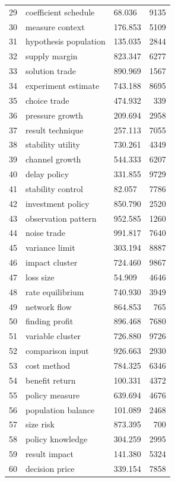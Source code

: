\documentclass[11pt]{report}
\begin{document}
\begin{longtable}{rllr}
29 & coefficient schedule & 68.036 & 9135 \\
30 & measure context & 176.853 & 5109 \\
31 & hypothesis population & 135.035 & 2844 \\
32 & supply margin & 823.347 & 6277 \\
33 & solution trade & 890.969 & 1567 \\
34 & experiment estimate & 743.188 & 8695 \\
35 & choice trade & 474.932 & 339 \\
36 & pressure growth & 209.694 & 2958 \\
37 & result technique & 257.113 & 7055 \\
38 & stability utility & 730.261 & 4349 \\
39 & channel growth & 544.333 & 6207 \\
40 & delay policy & 331.855 & 9729 \\
41 & stability control & 82.057 & 7786 \\
42 & investment policy & 850.790 & 2520 \\
43 & observation pattern & 952.585 & 1260 \\
44 & noise trade & 991.817 & 7640 \\
45 & variance limit & 303.194 & 8887 \\
46 & impact cluster & 724.460 & 9867 \\
47 & loss size & 54.909 & 4646 \\
48 & rate equilibrium & 740.930 & 3949 \\
49 & network flow & 864.853 & 765 \\
50 & finding profit & 896.468 & 7680 \\
51 & variable cluster & 726.880 & 9726 \\
52 & comparison input & 926.663 & 2930 \\
53 & cost method & 784.325 & 6346 \\
54 & benefit return & 100.331 & 4372 \\
55 & policy measure & 639.694 & 4676 \\
56 & population balance & 101.089 & 2468 \\
57 & size risk & 873.395 & 700 \\
58 & policy knowledge & 304.259 & 2995 \\
59 & result impact & 141.380 & 5324 \\
60 & decision price & 339.154 & 7858 \\
\end{longtable}
\end{document}
